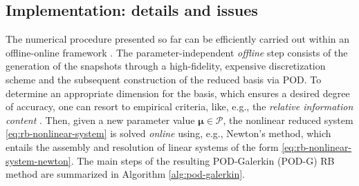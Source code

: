 \documentclass{elsarticle}
\numberwithin{equation}{section}
\theoremstyle{theorem}
\theoremstyle{definition}
\theoremstyle{remark}
\theoremstyle{proposition}
\numberwithin{figure}{section}
\newcommand{\bg}[1]{\boldsymbol{#1}}
\begin{document}
		\algrenewcommand\textproc{\textsc}
		
	
	
	\subsection{Implementation: details and issues}
	\label{section:Implementation: details and issues}
	
		The numerical procedure presented so far can be efficiently carried out within an offline-online framework \cite{Pru02}. The parameter-independent \emph{offline} step consists of the generation of the snapshots through a high-fidelity, expensive discretization scheme and the subsequent construction of the reduced basis via POD. To determine an appropriate dimension for the basis, which ensures a desired degree of accuracy, one can resort to empirical criteria, like, e.g., the \emph{relative information content} \cite{QMN15}. Then, given a new parameter value $\bg{\mu} \in \mathcal{P}$, the nonlinear reduced system \eqref{eq:rb-nonlinear-system} is solved \emph{online} using, e.g., Newton's method, which entails the assembly and resolution of linear systems of the form \eqref{eq:rb-nonlinear-system-newton}. The main steps of the resulting POD-Galerkin (POD-G) RB method are summarized in Algorithm \ref{alg:pod-galerkin}.
				
\end{document}
